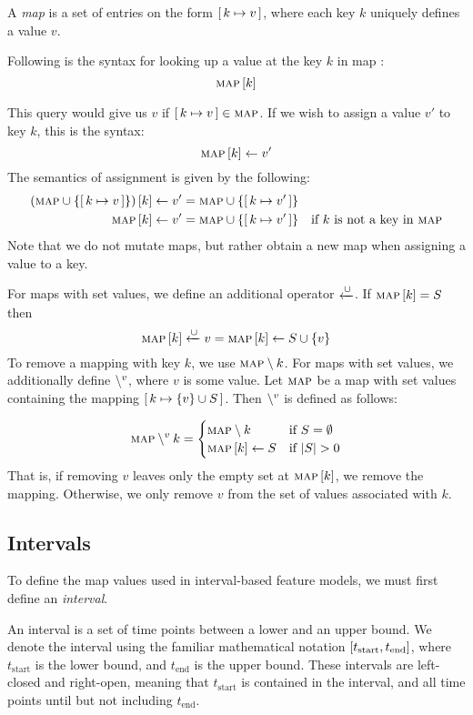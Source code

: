 \begin{definition}[Map]
  A \emph{map} is a set of entries on the form $[ \,k \mapsto v\, ]$, where each key $k$ uniquely defines a value $v$. 
  \label{def:map}
\end{definition}

Following is the syntax for looking up a value at the key $k$ in map :
\[
  \textsc{map} \left[ k \right]
\]

This query would give us $v$ if $[ \,k \mapsto v\, ] \in \textsc{map}$. If we wish to assign a value $v'$ to key $k$, this is the syntax:
\[
\textsc{map} \left[ k \right] \leftarrow v'
\]
The semantics of assignment is given by the following:
\begin{align*}
  \left(\textsc{map} \cup \left\{[ \,k \mapsto v\, ]\right\}\right) \left[ k \right] \leftarrow v' &= \textsc{map} \cup \left\{[ \,k \mapsto v'\, ]\right\} &&\\
  \textsc{map} \left[ k \right] \leftarrow v' &= \textsc{map} \cup \left\{[ \,k \mapsto v'\, ]\right\} && \text{if $k$ is not a key in \textsc{map}}
\end{align*}
Note that we do not mutate maps, but rather obtain a new map when assigning a value to a key. 

For maps with set values, we define an additional operator $\xleftarrow{\cup}$. If $\textsc{map} \left[ k \right] = S$ then 
\[\textsc{map} \left[ k \right] \xleftarrow{\cup} v = \textsc{map} \left[ k \right] \leftarrow S \cup \{v\}\]
To remove a mapping with key $k$, we use $\textsc{map} \setminus k$. For maps with set values, we additionally define $\setminus^{v}$, where $v$ is some value. Let $\textsc{map}$ be a map with set values containing the mapping $[ \,k \mapsto \{v\} \cup S\, ]$. Then $\setminus^{v}$ is defined as follows:

\[
  \textsc{map} \setminus^{v} k =
  \begin{cases}
    \textsc{map} \setminus k & \text{if } S = \emptyset\\
    \textsc{map} \left[ k \right] \leftarrow S & \text{if } |S| > 0
  \end{cases}
\]
That is, if removing $v$ leaves only the empty set at $\textsc{map} \left[ k \right]$, we remove the mapping. Otherwise, we only remove $v$ from the set of values associated with $k$. 

\subsection{Intervals}
\label{sub:intervals}
To define the map values used in interval-based feature models, we must first define an \emph{interval}.
\begin{definition}[Interval]
  An interval is a set of time points between a lower and an upper bound. We denote the interval using the familiar mathematical notation $\interval{t_\text{start}}{t_\text{end}}$, where $t_\text{start}$ is the lower bound, and $t_\text{end}$ is the upper bound. These intervals are left-closed and right-open, meaning that $t_\text{start}$ is contained in the interval, and all time points until but not including $t_\text{end}$.
  \label{def:interval}
\end{definition}

